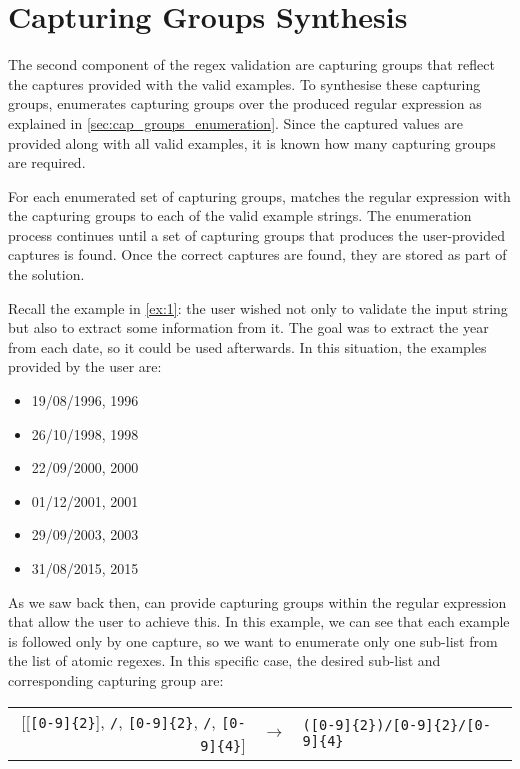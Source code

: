 \section{Capturing Groups Synthesis}
The second component of the regex validation are capturing groups that reflect the captures provided with the valid examples. To synthesise these capturing groups, \Forest enumerates capturing groups over the produced regular expression as explained in \autoref{sec:cap_groups_enumeration}. Since the captured values are provided along with all valid examples, it is known how many capturing groups are required.

For each enumerated set of capturing groups, \Forest matches the regular expression with the capturing groups to each of the valid example strings. The enumeration process continues until a set of capturing groups that produces the user-provided captures is found. Once the correct captures are found, they are stored as part of the solution.

\begin{example}
Recall the example in \autoref{ex:1}: the user wished not only to validate the input string but also to extract some information from it. The goal was to extract the year from each date, so it could be used afterwards. In this situation, the examples provided by the user are:
%
\begin{multicols}{3}
    \begin{itemize}[label={}]
    \item 19/08/1996, 1996
    \item 26/10/1998, 1998
    \item 22/09/2000, 2000
    \item 01/12/2001, 2001
    \item 29/09/2003, 2003
    \item 31/08/2015, 2015
    \end{itemize}
\end{multicols}
%
As we saw back then, \Forest can provide capturing groups within the regular expression that allow the user to achieve this. In this example, we can see that each example is followed only by one capture, so we want to enumerate only one sub-list from the list of atomic regexes. In this specific case, the desired sub-list and corresponding capturing group are:
%
\begin{center}
\begin{tabular}{rcl}
[[\verb![0-9]{2}!], \verb!/!, \verb![0-9]{2}!, \verb!/!, \verb![0-9]{4}!] & $\rightarrow$ & \verb!([0-9]{2})/[0-9]{2}/[0-9]{4}!
\end{tabular}\bigskip
\end{center}
\end{example}



